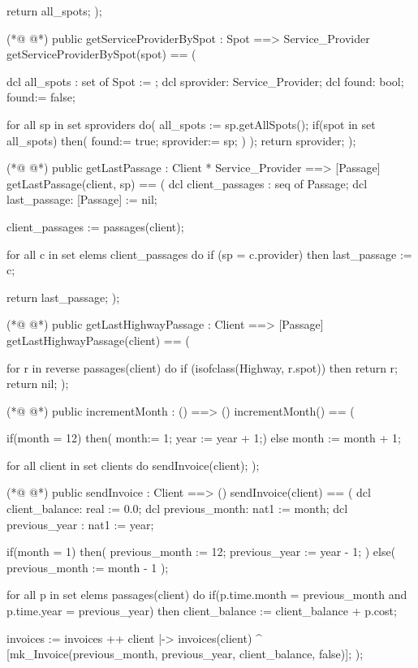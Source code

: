 \begin{vdmpp}[breaklines=true]
   return all_spots;
 );
 
(*@
\label{getServiceProviderBySpot:78}
@*)
 public getServiceProviderBySpot : Spot ==> Service_Provider
  getServiceProviderBySpot(spot) == (
  
  dcl all_spots : set of Spot := {};
  dcl sprovider: Service_Provider;
  dcl found: bool;
  found:= false;
  
  for all sp in set sproviders do(
   all_spots := sp.getAllSpots();
   if(spot in set all_spots) then( 
     found:= true;
    sprovider:= sp;
    )
  );
   return sprovider;
  );
  
(*@
\label{getLastPassage:96}
@*)
  public getLastPassage : Client * Service_Provider ==> [Passage]
  getLastPassage(client, sp) == (
  dcl client_passages : seq of Passage;
  dcl last_passage: [Passage] := nil;
   
   client_passages := passages(client);
   
   for all c in set elems client_passages do
    if (sp = c.provider) then
     last_passage := c;
     
   return last_passage;
 );
 
(*@
\label{getLastHighwayPassage:110}
@*)
 public getLastHighwayPassage : Client ==> [Passage]
 getLastHighwayPassage(client) == (
  
   for r in reverse passages(client) do
    if (isofclass(Highway, r.spot)) then
     return r;   
   return nil; 
 );
 
(*@
\label{incrementMonth:119}
@*)
 public incrementMonth : () ==> ()
  incrementMonth() == (
   
   if(month = 12) then(
    month:= 1;
    year := year + 1;)
   else
    month := month + 1;
    
   for all client in set clients do
    sendInvoice(client);
  );
  
(*@
\label{sendInvoice:132}
@*)
  public sendInvoice : Client ==> ()
  sendInvoice(client) == (
    dcl client_balance: real := 0.0;
    dcl previous_month: nat1 := month;
    dcl previous_year : nat1 := year;
    
    if(month = 1) then(
     previous_month := 12;
     previous_year := year - 1;
    )
    else(
     previous_month := month - 1
    );

    for all p in set elems passages(client) do
     if(p.time.month = previous_month and p.time.year = previous_year) then
      client_balance := client_balance + p.cost;
    
    invoices := invoices ++ {client |-> invoices(client) ^ [mk_Invoice(previous_month, previous_year, client_balance, false)]};
  );
  

\end{vdmpp}
